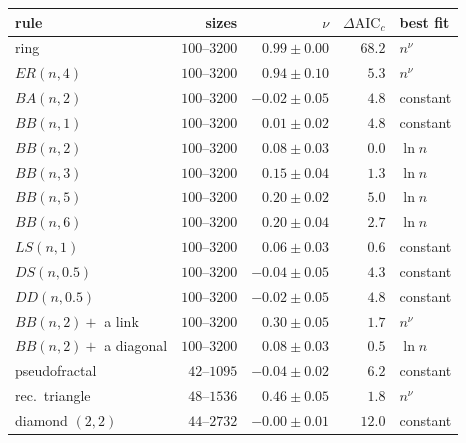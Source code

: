 \begin{center}
\footnotesize\setlength{\tabcolsep}{4pt}
\begin{tabular}{lrrrl}
\hline
rule & sizes & $\nu$ & $\Delta\mathrm{AIC}_c$ & best fit\\
\hline
ring & $100$--$3200$ & $0.99\pm0.00$ & $68.2$ & $n^{\nu}$\\
$ER(n,4)$ & $100$--$3200$ & $0.94\pm0.10$ & $5.3$ & $n^{\nu}$\\
$BA(n,2)$ & $100$--$3200$ & $-0.02\pm0.05$ & $4.8$ & constant\\
$BB(n,1)$ & $100$--$3200$ & $0.01\pm0.02$ & $4.8$ & constant\\
$BB(n,2)$ & $100$--$3200$ & $0.08\pm0.03$ & $0.0$ & $\ln n$\\
$BB(n,3)$ & $100$--$3200$ & $0.15\pm0.04$ & $1.3$ & $\ln n$\\
$BB(n,5)$ & $100$--$3200$ & $0.20\pm0.02$ & $5.0$ & $\ln n$\\
$BB(n,6)$ & $100$--$3200$ & $0.20\pm0.04$ & $2.7$ & $\ln n$\\
$LS(n,1)$ & $100$--$3200$ & $0.06\pm0.03$ & $0.6$ & constant\\
$DS(n,0.5)$ & $100$--$3200$ & $-0.04\pm0.05$ & $4.3$ & constant\\
$DD(n,0.5)$ & $100$--$3200$ & $-0.02\pm0.05$ & $4.8$ & constant\\
$BB(n,2)+$ a link & $100$--$3200$ & $0.30\pm0.05$ & $1.7$ & $n^{\nu}$\\
$BB(n,2)+$ a diagonal & $100$--$3200$ & $0.08\pm0.03$ & $0.5$ & $\ln n$\\
pseudofractal & $42$--$1095$ & $-0.04\pm0.02$ & $6.2$ & constant\\
rec.\ triangle & $48$--$1536$ & $0.46\pm0.05$ & $1.8$ & $n^{\nu}$\\
diamond $(2,2)$ & $44$--$2732$ & $-0.00\pm0.01$ & $12.0$ & constant\\
\hline
\end{tabular}
\end{center}
